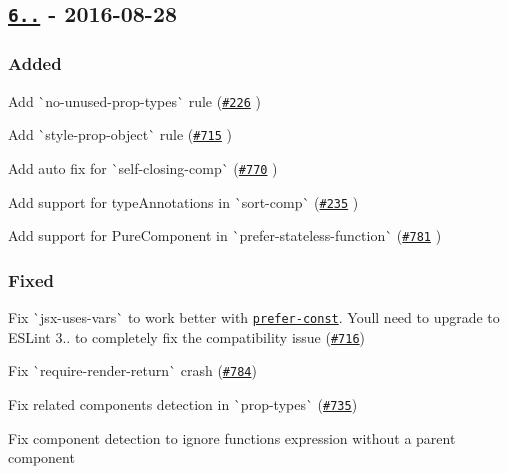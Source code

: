 \subsection*{\href{https://github.com/yannickcr/eslint-plugin-react/compare/v6.1.2...v6.2.0}{\tt 6..} -\/ 2016-\/08-\/28}

\subsubsection*{Added}


\begin{DoxyItemize}
\item Add \`{}no-\/unused-\/prop-\/types\`{} rule (\href{https://github.com/yannickcr/eslint-plugin-react/issues/226}{\tt \#226} )
\item Add \`{}style-\/prop-\/object\`{} rule (\href{https://github.com/yannickcr/eslint-plugin-react/issues/715}{\tt \#715} )
\item Add auto fix for \`{}self-\/closing-\/comp\`{} (\href{https://github.com/yannickcr/eslint-plugin-react/pull/770}{\tt \#770} )
\item Add support for {\ttfamily type\+Annotations} in \`{}sort-\/comp\`{} (\href{https://github.com/yannickcr/eslint-plugin-react/issues/235}{\tt \#235} )
\item Add support for {\ttfamily Pure\+Component} in \`{}prefer-\/stateless-\/function\`{} (\href{https://github.com/yannickcr/eslint-plugin-react/pull/781}{\tt \#781} )
\end{DoxyItemize}

\subsubsection*{Fixed}


\begin{DoxyItemize}
\item Fix \`{}jsx-\/uses-\/vars\`{} to work better with \href{http://eslint.org/docs/rules/prefer-const}{\tt {\ttfamily prefer-\/const}}. You\textquotesingle{}ll need to upgrade to E\+S\+Lint 3.. to completely fix the compatibility issue (\href{https://github.com/yannickcr/eslint-plugin-react/issues/716}{\tt \#716})
\item Fix \`{}require-\/render-\/return\`{} crash (\href{https://github.com/yannickcr/eslint-plugin-react/issues/784}{\tt \#784})
\item Fix related components detection in \`{}prop-\/types\`{} (\href{https://github.com/yannickcr/eslint-plugin-react/issues/735}{\tt \#735})
\item Fix component detection to ignore functions expression without a parent component
\end{DoxyItemize}

